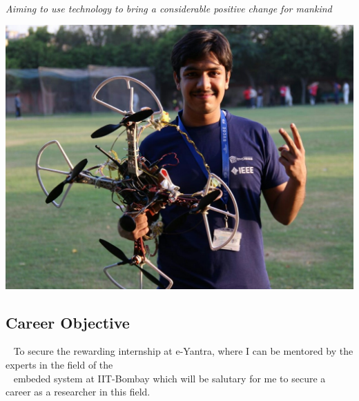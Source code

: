 \documentclass[11pt]{article}
\begin{document}
\begin{mdframed}[backgroundcolor=orange]
~
\begin{center}
\begin{Huge}
\end{Huge}
\end{center}
\begin{center}
\begin{large}
\color{white}\emph{Aiming to use technology to bring a considerable positive change for mankind}
\end{large}
\end{center}
\end{mdframed}
\begin{minipage}{1.00\linewidth}
\begin{center}
\includegraphics[scale=0.169]{siddhant_image}
\end{center}

\begin{flushleft}
\section{\color{red}Car\color{purple}e\color{black}er Obje\color{purple}ct\color{black}ive}
~
To secure the rewarding internship at e-Yantra, where I can be mentored by the experts in the field of the\\ ~ embeded system at IIT-Bombay which will be salutary for me to secure a career as a researcher in this field.

\end{flushleft}
\end{minipage}
\end{document}
